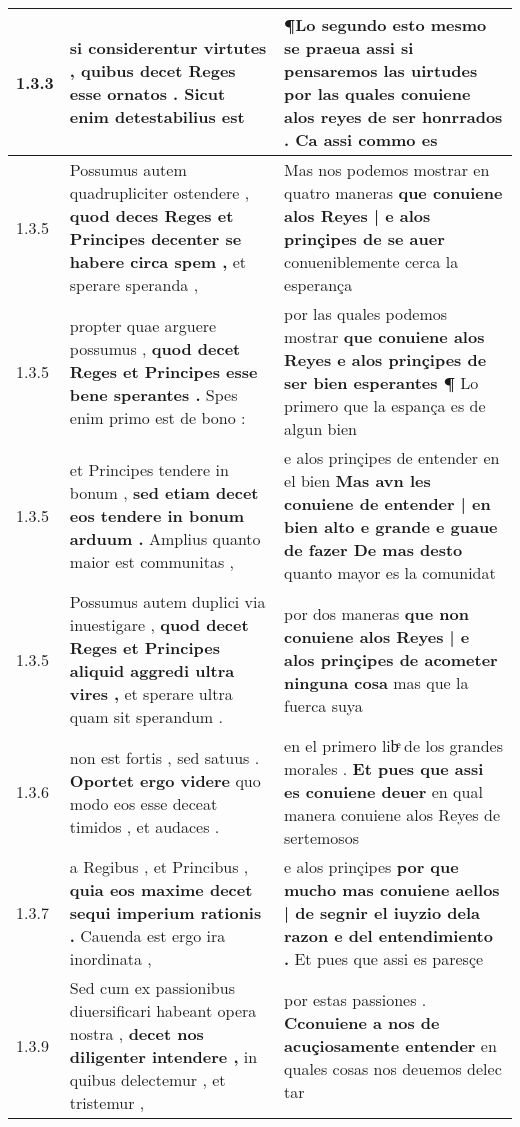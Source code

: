 \begin{tabular}{|p{1cm}|p{6.5cm}|p{6.5cm}|}
1.3.3 & si considerentur virtutes , \textbf{ quibus decet Reges esse ornatos . } Sicut enim detestabilius est & ¶Lo segundo esto mesmo se praeua assi si pensaremos las uirtudes \textbf{ por las quales conuiene alos reyes de ser honrrados . } Ca assi commo es \\\hline
1.3.5 & Possumus autem quadrupliciter ostendere , \textbf{ quod deces Reges et Principes decenter se habere circa spem , } et sperare speranda , & Mas nos podemos mostrar en quatro maneras \textbf{ que conuiene alos Reyes | e alos prinçipes de se auer } conueniblemente cerca la esperança \\\hline
1.3.5 & propter quae arguere possumus , \textbf{ quod decet Reges et Principes esse bene sperantes . } Spes enim primo est de bono : & por las quales podemos mostrar \textbf{ que conuiene alos Reyes e alos prinçipes de ser bien esperantes ¶ } Lo primero que la espança es de algun bien \\\hline
1.3.5 & et Principes tendere in bonum , \textbf{ sed etiam decet eos tendere in bonum arduum . } Amplius quanto maior est communitas , & e alos prinçipes de entender en el bien \textbf{ Mas avn les conuiene de entender | en bien alto e grande e guaue de fazer De mas desto } quanto mayor es la comunidat \\\hline
1.3.5 & Possumus autem duplici via inuestigare , \textbf{ quod decet Reges et Principes aliquid aggredi ultra vires , } et sperare ultra quam sit sperandum . & por dos maneras \textbf{ que non conuiene alos Reyes | e alos prinçipes de acometer ninguna cosa } mas que la fuerca suya \\\hline
1.3.6 & non est fortis , sed satuus . \textbf{ Oportet ergo videre } quo modo eos esse deceat timidos , et audaces . & en el primero libͤ de los grandes morales . \textbf{ Et pues que assi es conuiene deuer } en qual manera conuiene alos Reyes de sertemosos \\\hline
1.3.7 & a Regibus , et Princibus , \textbf{ quia eos maxime decet sequi imperium rationis . } Cauenda est ergo ira inordinata , & e alos prinçipes \textbf{ por que mucho mas conuiene aellos | de segnir el iuyzio dela razon e del entendimiento . } Et pues que assi es paresçe \\\hline
1.3.9 & Sed cum ex passionibus diuersificari habeant opera nostra , \textbf{ decet nos diligenter intendere , } in quibus delectemur , et tristemur , & por estas passiones . \textbf{ Cconuiene a nos de acuçiosamente entender } en quales cosas nos deuemos delec tar \\\hline

\end{tabular}
